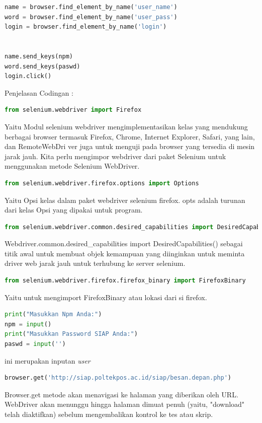 \begin{enumerate}
\begin{lstlisting}[language=Python]
name = browser.find_element_by_name('user_name')
word = browser.find_element_by_name('user_pass')
login = browser.find_element_by_name('login')


name.send_keys(npm)
word.send_keys(paswd)
login.click()

\end{lstlisting}

Penjelasan Codingan :
\begin{lstlisting}[language=Python]
from selenium.webdriver import Firefox
\end{lstlisting}
Yaitu Modul selenium webdriver mengimplementasikan kelas yang mendukung berbagai browser termasuk Firefox, Chrome, Internet Explorer, Safari, yang lain, dan RemoteWebDri	ver juga untuk menguji pada browser yang tersedia di mesin jarak jauh. Kita perlu mengimpor webdriver dari paket Selenium untuk menggunakan metode Selenium WebDriver.

\begin{lstlisting}[language=Python]
from selenium.webdriver.firefox.options import Options
\end{lstlisting}
Yaitu Opsi kelas dalam paket webdriver selenium firefox. opts adalah turunan dari kelas Opsi yang dipakai untuk program.

\begin{lstlisting}[language=Python]
from selenium.webdriver.common.desired_capabilities import DesiredCapabilities
\end{lstlisting}
Webdriver.common.desired\_capabilities import DesiredCapabilities()
sebagai titik awal untuk membuat objek kemampuan yang diinginkan untuk meminta driver web jarak jauh untuk terhubung ke server selenium.

\begin{lstlisting}[language=Python]
from selenium.webdriver.firefox.firefox_binary import FirefoxBinary
\end{lstlisting}
Yaitu untuk mengimport FirefoxBinary atau lokasi dari si firefox.

\begin{lstlisting}[language=Python]
print("Masukkan Npm Anda:")
npm = input()
print("Masukkan Password SIAP Anda:")
paswd = input('')

\end{lstlisting}
ini merupakan inputan \textit{user}

\begin{lstlisting}[language=Python]
browser.get('http://siap.poltekpos.ac.id/siap/besan.depan.php')
\end{lstlisting}
Browser.get metode akan menavigasi ke halaman yang diberikan oleh URL. WebDriver akan menunggu hingga halaman dimuat penuh (yaitu, "download" telah diaktifkan) sebelum mengembalikan kontrol ke tes atau skrip.


\end{enumerate}
